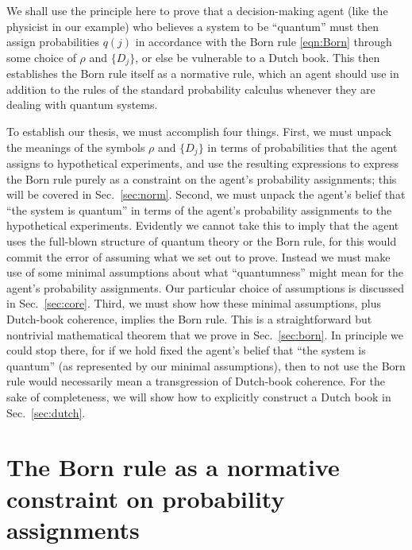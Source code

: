 \documentclass[%
 reprint,superscriptaddress,
 amsmath,amssymb,
 aps,twocolumn,pra
]{revtex4-1}
\begin{document}
We shall use the principle here to prove that a decision-making agent (like the physicist in our example) who believes a system to be ``quantum'' must then assign probabilities $q(j)$ in accordance with the Born rule \eqref{eqn:Born} through some choice of $\rho$ and $\{ D_j \}$, or else be vulnerable to a Dutch book. This then establishes the Born rule itself as a normative rule, which an agent should use in addition to the rules of the standard probability calculus whenever they are dealing with quantum systems.

To establish our thesis, we must accomplish four things. First, we must unpack the meanings of the symbols $\rho$ and $\{ D_j \}$ in terms of probabilities that the agent assigns to hypothetical experiments, and use the resulting expressions to express the Born rule purely as a constraint on the agent's probability assignments; this will be covered in Sec.\ \ref{sec:norm}\@.
Second, we must unpack the agent's belief that ``the system is quantum'' in terms of the agent's probability assignments to the hypothetical experiments. Evidently we cannot take this to imply that the agent uses the full-blown structure of quantum theory or the Born rule, for this would commit the error of assuming what we set out to prove. Instead we must make use of some minimal assumptions about what ``quantumness'' might mean for the agent's probability assignments. Our particular choice of assumptions is discussed in Sec.\ \ref{sec:core}\@.
Third, we must show how these minimal assumptions, plus Dutch-book coherence, implies the Born rule. This is a straightforward but nontrivial mathematical theorem that we prove in Sec.\ \ref{sec:born}\@. In principle we could stop there, for if we hold fixed the agent's belief that ``the system is quantum'' (as represented by our minimal assumptions), then to not use the Born rule would necessarily mean a transgression of Dutch-book coherence. For the sake of completeness, we will show how to explicitly construct a Dutch book in Sec.\ \ref{sec:dutch}.

\section{The Born rule as a normative constraint on probability assignments \label{sec:norm}}
\end{document}
